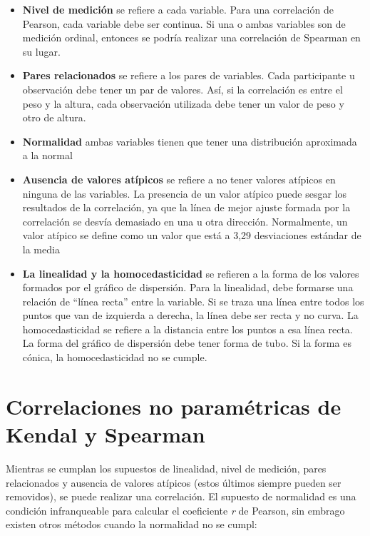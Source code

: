\documentclass[
]{book}
\begin{document}
\begin{itemize}
\item
  \textbf{Nivel de medición} se refiere a cada variable. Para una correlación de Pearson, cada variable debe ser continua. Si una o ambas variables son de medición ordinal, entonces se podría realizar una correlación de Spearman en su lugar.
\item
  \textbf{Pares relacionados} se refiere a los pares de variables. Cada participante u observación debe tener un par de valores. Así, si la correlación es entre el peso y la altura, cada observación utilizada debe tener un valor de peso y otro de altura.
\item
  \textbf{Normalidad} ambas variables tienen que tener una distribución aproximada a la normal
\item
  \textbf{Ausencia de valores atípicos} se refiere a no tener valores atípicos en ninguna de las variables. La presencia de un valor atípico puede sesgar los resultados de la correlación, ya que la línea de mejor ajuste formada por la correlación se desvía demasiado en una u otra dirección. Normalmente, un valor atípico se define como un valor que está a 3,29 desviaciones estándar de la media
\item
  \textbf{La linealidad y la homocedasticidad} se refieren a la forma de los valores formados por el gráfico de dispersión. Para la linealidad, debe formarse una relación de ``línea recta'' entre la variable. Si se traza una línea entre todos los puntos que van de izquierda a derecha, la línea debe ser recta y no curva. La homocedasticidad se refiere a la distancia entre los puntos a esa línea recta. La forma del gráfico de dispersión debe tener forma de tubo. Si la forma es cónica, la homocedasticidad no se cumple.
\end{itemize}

\hypertarget{correlaciones-no-paramuxe9tricas-de-kendal-y-spearman}{%
\section{Correlaciones no paramétricas de Kendal y Spearman}\label{correlaciones-no-paramuxe9tricas-de-kendal-y-spearman}}

Mientras se cumplan los supuestos de linealidad, nivel de medición, pares relacionados y ausencia de valores atípicos (estos últimos siempre pueden ser removidos), se puede realizar una correlación. El supuesto de normalidad es una condición infranqueable para calcular el coeficiente \emph{r} de Pearson, sin embrago existen otros métodos cuando la normalidad no se cumpl:
\end{document}

